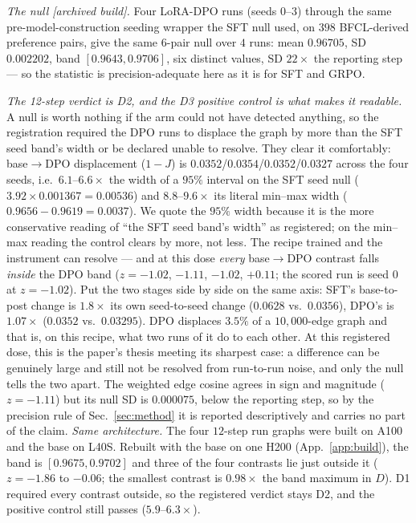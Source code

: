\documentclass{article}
\begin{document}
\emph{The null [archived build].} Four LoRA-DPO runs (seeds $0$--$3$) through the same pre-model-construction seeding wrapper the SFT null used, on $398$ BFCL-derived preference pairs, give the same $6$-pair null over $4$ runs: mean $0.96705$, SD $0.002202$, band $[0.9643,0.9706]$, six distinct values, SD $22\times$ the reporting step --- so the statistic is precision-adequate here as it is for SFT and GRPO.

\emph{The 12-step verdict is D2, and the D3 positive control is what makes it readable.} A null is worth nothing if the arm could not have detected anything, so the registration required the DPO runs to displace the graph by more than the SFT seed band's width or be declared unable to resolve. They clear it comfortably: base$\to$DPO displacement ($1-J$) is $0.0352$/$0.0354$/$0.0352$/$0.0327$ across the four seeds, i.e.\ $6.1$--$6.6\times$ the width of a $95\%$ interval on the SFT seed null ($3.92\times0.001367=0.00536$) and $8.8$--$9.6\times$ its literal min--max width ($0.9656-0.9619=0.0037$). We quote the $95\%$ width because it is the more conservative reading of ``the SFT seed band's width'' as registered; on the min--max reading the control clears by more, not less. The recipe trained and the instrument can resolve --- and at this dose \emph{every} base$\to$DPO contrast falls \emph{inside} the DPO band ($z=-1.02$, $-1.11$, $-1.02$, $+0.11$; the scored run is seed $0$ at $z=-1.02$). Put the two stages side by side on the same axis: SFT's base-to-post change is $1.8\times$ its own seed-to-seed change ($0.0628$ vs.\ $0.0356$), DPO's is $1.07\times$ ($0.0352$ vs.\ $0.03295$). DPO displaces $3.5\%$ of a $10{,}000$-edge graph and that is, on this recipe, what two runs of it do to each other. At this registered dose, this is the paper's thesis meeting its sharpest case: a difference can be genuinely large and still not be resolved from run-to-run noise, and only the null tells the two apart. The weighted edge cosine agrees in sign and magnitude ($z=-1.11$) but its null SD is $0.000075$, below the reporting step, so by the precision rule of Sec.~\ref{sec:method} it is reported descriptively and carries no part of the claim. \emph{Same architecture.} The four $12$-step run graphs were built on A100 and the base on L40S. Rebuilt with the base on one H200 (App.~\ref{app:build}), the band is $[0.9675,0.9702]$ and three of the four contrasts lie just outside it ($z=-1.86$ to $-0.06$; the smallest contrast is $0.98\times$ the band maximum in $D$). D1 required every contrast outside, so the registered verdict stays D2, and the positive control still passes ($5.9$--$6.3\times$).
\end{document}
